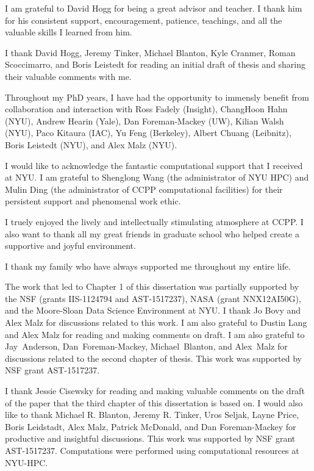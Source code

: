 I am grateful to David Hogg for being a great advisor and teacher. 
I thank him for his consistent support, encouragement, patience, teachings, 
and all the valuable skills I learned from him.

I thank David Hogg, Jeremy Tinker, Michael Blanton, Kyle Cranmer, Roman Scoccimarro, and Boris Leistedt for 
reading an initial draft of thesis and sharing their valuable comments with me.

Throughout my PhD years, I have had the opportunity to immensly benefit from collaboration and 
interaction with Ross Fadely (Insight), ChangHoon Hahn (NYU), Andrew Hearin (Yale), Dan Foreman-Mackey (UW), 
Kilian Walsh (NYU), Paco Kitaura (IAC), Yu Feng (Berkeley), Albert Chuang (Leibnitz), Boris Leistedt (NYU), and Alex Malz (NYU).

I would like to acknowledge the fantastic computational support that I received at NYU. 
I am grateful to Shenglong Wang (the administrator of NYU HPC) and Mulin Ding (the administrator 
of CCPP computational facilities) for their persistent support and phenomenal work ethic. 

I truely enjoyed the lively and intellectually stimulating atmosphere at CCPP.
I also want to thank all my great friends in graduate school who helped create a 
supportive and joyful environment.  

I thank my family who have always supported me throughout my entire life.

The work that led to Chapter 1 of this dissertation was partially supported by the NSF (grants IIS-1124794 and AST-1517237), 
NASA (grant NNX12AI50G), and the Moore-Sloan Data Science Environment at NYU. I thank Jo Bovy and Alex Malz for discussions related to this work. 
I am also grateful to Dustin Lang and Alex Malz for reading and making comments on draft. 
I am also grateful to Jay~Anderson, Dan~Foreman-Mackey, Michael~Blanton, and Alex~Malz for discussions related to the second chapter of thesis.
This work was supported by NSF grant AST-1517237.

I thank Jessie Cisewsky for reading and making valuable comments on the draft of the paper that 
the third chapter of this dissertation is based on. I would also like to thank Michael R. Blanton, 
Jeremy R. Tinker, Uros Seljak, Layne Price, Boris Leidstadt, Alex Malz, Patrick McDonald, and Dan Foreman-Mackey 
for productive and insightful discussions. This work was supported by NSF grant AST-1517237. 
Computations were performed using computational resources at NYU-HPC. 

